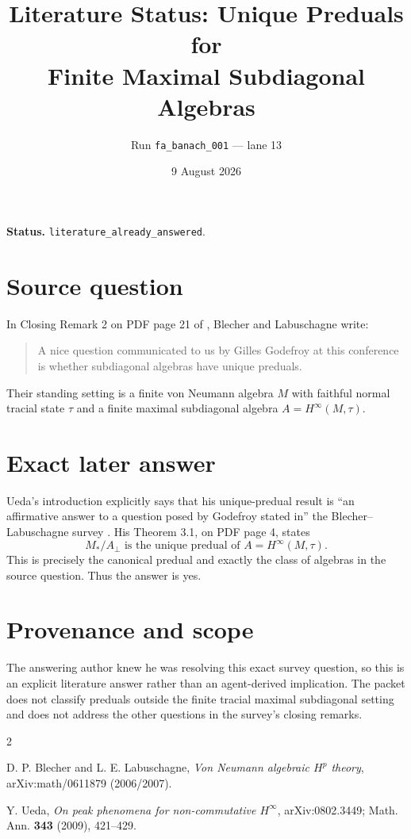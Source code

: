 \documentclass[10pt]{article}
\title{Literature Status: Unique Preduals for\\
Finite Maximal Subdiagonal Algebras}
\author{Run \texttt{fa\_banach\_001} --- lane 13}
\date{9 August 2026}
\begin{document}
\maketitle

\noindent\textbf{Status.} \texttt{literature\_already\_answered}.

\section*{Source question}

In Closing Remark 2 on PDF page 21 of \cite{BL2007}, Blecher and
Labuschagne write:
\begin{quote}
A nice question communicated to us by Gilles Godefroy at this conference is
whether subdiagonal algebras have unique preduals.
\end{quote}
Their standing setting is a finite von Neumann algebra $M$ with faithful normal
tracial state $\tau$ and a finite maximal subdiagonal algebra
$A=H^\infty(M,\tau)$.

\section*{Exact later answer}

Ueda's introduction explicitly says that his unique-predual result is ``an
affirmative answer to a question posed by Godefroy stated in'' the
Blecher--Labuschagne survey \cite[p.~2]{Ueda2008}.  His Theorem 3.1, on PDF
page 4, states
\[
       M_*/A_\perp \text{ is the unique predual of }
       A=H^\infty(M,\tau).
\]
This is precisely the canonical predual and exactly the class of algebras in
the source question.  Thus the answer is yes.

\section*{Provenance and scope}

The answering author knew he was resolving this exact survey question, so this
is an explicit literature answer rather than an agent-derived implication.
The packet does not classify preduals outside the finite tracial maximal
subdiagonal setting and does not address the other questions in the survey's
closing remarks.

\begin{thebibliography}{2}

D. P. Blecher and L. E. Labuschagne,
\emph{Von Neumann algebraic $H^p$ theory},
arXiv:math/0611879 (2006/2007).

Y. Ueda,
\emph{On peak phenomena for non-commutative $H^\infty$},
arXiv:0802.3449; Math. Ann. \textbf{343} (2009), 421--429.

\end{thebibliography}
\end{document}
